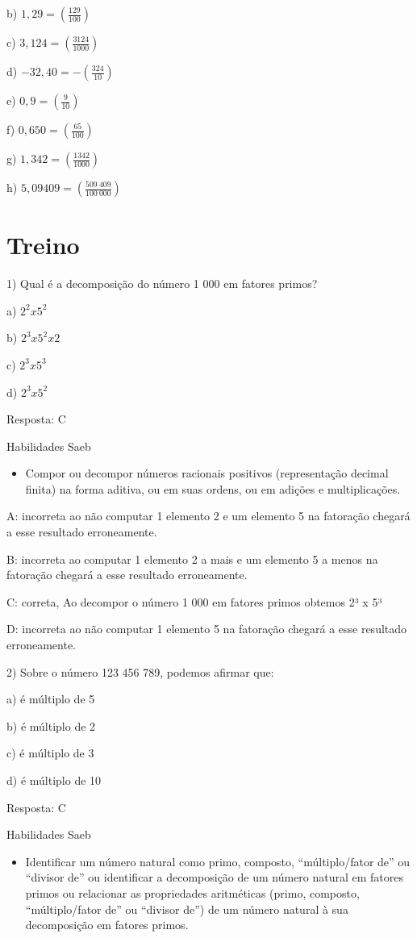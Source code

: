 b) $1,29 = (\frac{129}{100})$

c) $3,124 = (\frac{3124}{1000})$

d) $-32,40 = -(\frac{324}{10})$

e) $0,9 = (\frac{9}{10})$

f) $0,650 = (\frac{65}{100})$

g) $1,342 = (\frac{1342}{1000})$

h) $5,09409 = (\frac{509\ 409}{100\ 000})$

\section{Treino}

1) Qual é a decomposição do número 1 000 em fatores primos?

a) $2^2 x 5^2$

b) $2^3 x 5^2 x 2$

c) $2^3 x 5^3$

d) $2^3x5^2$

Resposta: C

Habilidades Saeb

\begin{itemize}
\tightlist
\item
  Compor ou decompor números racionais positivos (representação decimal
  finita) na forma aditiva, ou em suas ordens, ou em adições e
  multiplicações.
\end{itemize}

A: incorreta ao não computar 1 elemento 2 e um elemento 5 na fatoração
chegará a esse resultado erroneamente.

B: incorreta ao computar 1 elemento 2 a mais e um elemento 5 a menos na
fatoração chegará a esse resultado erroneamente.

C: correta, Ao decompor o número 1 000 em fatores primos obtemos 2³ x 5³

D: incorreta ao não computar 1 elemento 5 na fatoração chegará a esse
resultado erroneamente.

2) Sobre o número 123 456 789, podemos afirmar que:

a) é múltiplo de 5

b) é múltiplo de 2

c) é múltiplo de 3

d) é múltiplo de 10

Resposta: C

Habilidades Saeb

\begin{itemize}
\tightlist
\item
  Identificar um número natural como primo, composto, ``múltiplo/fator
  de'' ou ``divisor de'' ou identificar a decomposição de um número
  natural em fatores primos ou relacionar as propriedades aritméticas
  (primo, composto, ``múltiplo/fator de'' ou ``divisor de'') de um
  número natural à sua decomposição em fatores primos.
\end{itemize}


